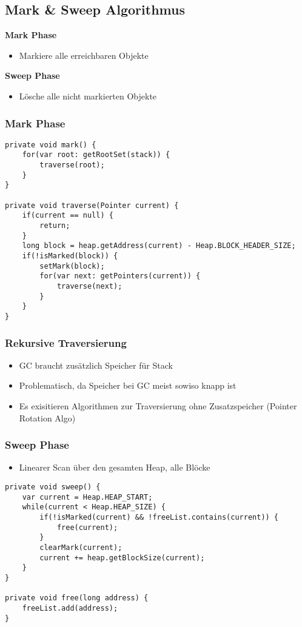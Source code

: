\subsection{Mark \& Sweep Algorithmus}
\textbf{Mark Phase}
\begin{itemize}
    \item Markiere alle erreichbaren Objekte
\end{itemize}
\textbf{Sweep Phase}
\begin{itemize}
    \item Lösche alle nicht markierten Objekte
\end{itemize}
\subsubsection{Mark Phase}
\begin{lstlisting}
private void mark() {
    for(var root: getRootSet(stack)) {
        traverse(root);
    }
}

private void traverse(Pointer current) {
    if(current == null) {
        return;
    }
    long block = heap.getAddress(current) - Heap.BLOCK_HEADER_SIZE;
    if(!isMarked(block)) {
        setMark(block);
        for(var next: getPointers(current)) {
            traverse(next);
        }
    }
}
\end{lstlisting}

\subsubsection{Rekursive Traversierung}
\begin{itemize}
    \item GC braucht zusätzlich Speicher für Stack
    \item Problematisch, da Speicher bei GC meist sowiso knapp ist
    \item Es exisitieren Algorithmen zur Traversierung ohne Zusatzspeicher (Pointer Rotation Algo)
\end{itemize}

\subsubsection{Sweep Phase}
\begin{itemize}
    \item Linearer Scan über den gesamten Heap, alle Blöcke
\end{itemize}
\begin{lstlisting}
private void sweep() {
    var current = Heap.HEAP_START;
    while(current < Heap.HEAP_SIZE) {
        if(!isMarked(current) && !freeList.contains(current)) {
            free(current);
        }
        clearMark(current);
        current += heap.getBlockSize(current);
    }
}

private void free(long address) {
    freeList.add(address);
}
\end{lstlisting}

